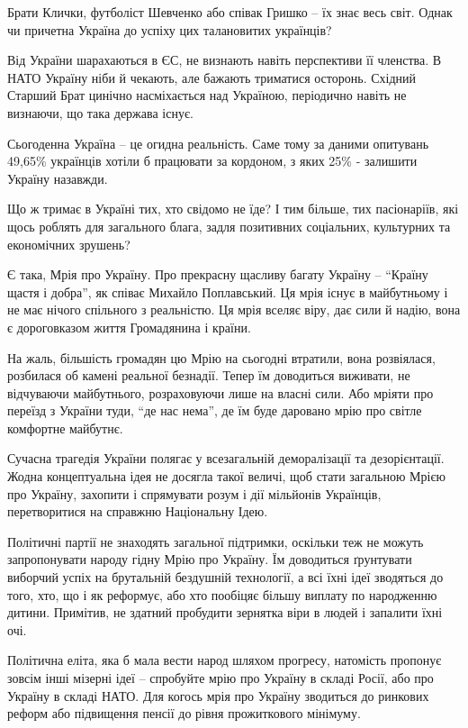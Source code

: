 \begin{multicols}{2}
Брати Клички, футболіст Шевченко або співак Гришко – їх знає весь світ. Однак
чи причетна Україна до успіху цих талановитих українців?

Від України шарахаються в ЄС, не визнають навіть перспективи її членства. В
НАТО Україну ніби й чекають, але бажають триматися осторонь. Східний Старший
Брат цинічно насміхається над Україною, періодично навіть не визнаючи, що така
держава існує.

Сьогоденна Україна – це огидна реальність. Саме тому за даними опитувань
49,65\% українців хотіли б працювати за кордоном, з яких 25\% - залишити
Україну назавжди.

Що ж тримає в Україні тих, хто свідомо не їде? І тим більше, тих пасіонаріїв,
які щось роблять для загального блага, задля позитивних соціальних, культурних
та економічних зрушень?


Є така, Мрія про Україну. Про прекрасну щасливу багату Україну – \enquote{Країну щастя
і добра}, як співає Михайло Поплавський. Ця мрія існує в майбутньому і не має
нічого спільного з реальністю. Ця мрія вселяє віру, дає сили й надію, вона є
дороговказом життя Громадянина і країни.

На жаль, більшість громадян цю Мрію на сьогодні втратили, вона розвіялася,
розбилася об камені реальної безнадії. Тепер їм доводиться виживати, не
відчуваючи майбутнього, розраховуючи лише на власні сили. Або мріяти про
переїзд з України туди, \enquote{де нас нема}, де їм буде даровано мрію про
світле комфортне майбутнє.

Сучасна трагедія України полягає у всезагальній деморалізації та дезорієнтації.
Жодна концептуальна ідея не досягла такої величі, щоб стати загальною Мрією про
Україну, захопити і спрямувати розум і дії мільйонів Українців, перетворитися
на справжню Національну Ідею.

Політичні партії не знаходять загальної підтримки, оскільки теж не можуть
запропонувати народу гідну Мрію про Україну. Їм доводиться ґрунтувати виборчий
успіх на брутальній бездушній технології, а всі їхні ідеї зводяться до того,
хто, що і як реформує, або хто пообіцяє більшу виплату по народженню дитини.
Примітив, не здатний пробудити зернятка віри в людей і запалити їхні очі.

Політична еліта, яка б мала вести народ шляхом прогресу, натомість пропонує
зовсім інші мізерні ідеї – спробуйте мрію про Україну в складі Росії, або про
Україну в складі НАТО. Для когось мрія про Україну зводиться до ринкових реформ
або підвищення пенсії до рівня прожиткового мінімуму.


\end{multicols}
